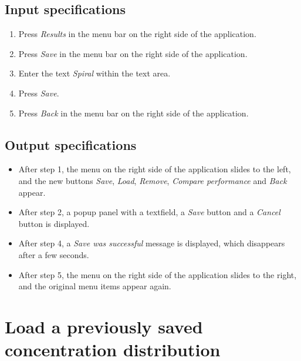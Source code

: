 \subsection*{Input specifications}
\begin{enumerate}
\item Press \emph{Results} in the menu bar on the right side of the application.
\item Press \emph{Save} in the menu bar on the right side of the application.
\item Enter the text \emph{Spiral} within the text area.
\item Press \emph{Save}.
\item Press \emph{Back} in the menu bar on the right side of the application.
\end{enumerate}

\subsection*{Output specifications}
\begin{itemize}
\item After step 1, the menu on the right side of the application slides to the left, and the new buttons \emph{Save}, \emph{Load}, \emph{Remove}, \emph{Compare performance} and \emph{Back} appear.
\item After step 2, a popup panel with a textfield, a \emph{Save} button and a \emph{Cancel} button is displayed.
\item After step 4, a \emph{Save was successful} message is displayed, which disappears after a few seconds.
\item After step 5, the menu on the right side of the application slides to the right, and the original menu items appear again.
\end{itemize}

\section{Load a previously saved concentration distribution}


